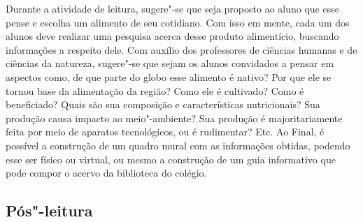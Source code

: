 \documentclass[12pt]{extarticle}
\begin{document}
Durante a atividade de leitura, sugere"-se que seja proposto ao aluno que
esse pense e escolha um alimento de seu cotidiano. Com isso em mente,
cada um dos alunos deve realizar uma pesquisa acerca desse produto
alimentício, buscando informações a respeito dele. Com auxílio dos
professores de ciências humanas e de ciências da natureza, sugere"-se que
sejam os alunos convidados a pensar em aspectos como, de que parte do
globo esse alimento é nativo? Por que ele se tornou base da alimentação
da região? Como ele é cultivado? Como é beneficiado? Quais são sua
composição e características nutricionais? Sua produção causa impacto ao
meio"-ambiente? Sua produção é majoritariamente feita por meio de
aparatos tecnológicos, ou é rudimentar? Etc. Ao Final, é possível a
construção de um quadro mural com as informações obtidas, podendo esse
ser físico ou virtual, ou mesmo a construção de um guia informativo que
pode compor o acervo da biblioteca do colégio.


\subsection{Pós"-leitura}

\end{document}
